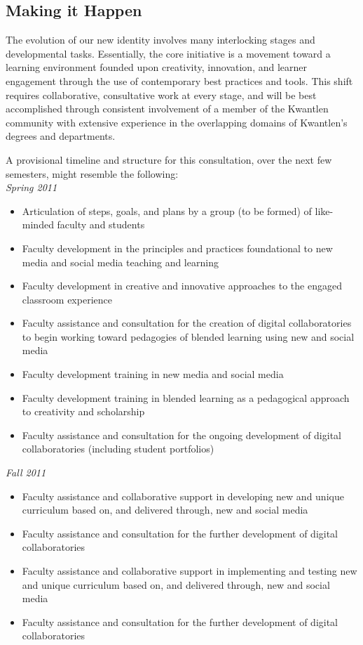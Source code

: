 \documentclass[10pt, letterpaper]{article}
\begin{document}
\subsection*{Making it Happen}

The evolution of our new identity involves many interlocking stages and developmental tasks. Essentially, the core initiative is a movement toward a learning environment founded upon creativity, innovation, and learner engagement through the use of contemporary best practices and tools. This shift requires collaborative, consultative work at every stage, and will be best accomplished through consistent involvement of a member of the Kwantlen community with extensive experience in the overlapping domains of Kwantlen's degrees and departments.

A provisional timeline and structure for this consultation, over the next few semesters, might resemble the following:\\[1em]
\noindent
\textit{Spring 2011}
\begin{itemize}
\item Articulation of steps, goals, and plans by a group (to be formed) of like-minded faculty and students
\item Faculty development in the principles and practices foundational to new media and social media teaching and learning
\item Faculty development in creative and innovative approaches to the engaged classroom experience
\item Faculty assistance and consultation for the creation of digital collaboratories to begin working toward pedagogies of blended learning using new and social media
\item Faculty development training in new media and social media
\item Faculty development training in blended learning as a pedagogical approach to creativity and scholarship
\item Faculty assistance and consultation for the ongoing development of digital collaboratories (including student portfolios)
\end{itemize}
\noindent
\textit{Fall 2011}
\begin{itemize}
\item Faculty assistance and collaborative support in developing new and unique curriculum based on, and delivered through, new and social media
\item Faculty assistance and consultation for the further development of digital collaboratories
\item Faculty assistance and collaborative support in implementing and testing new and unique curriculum based on, and delivered through, new and social media
\item Faculty assistance and consultation for the further development of digital collaboratories
\end{itemize}
\end{document}
